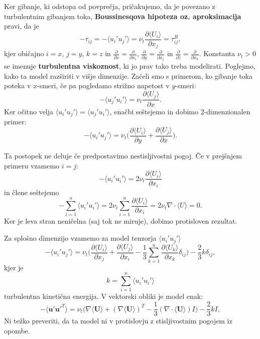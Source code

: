 \documentclass[mat2, tisk]{fmfdelo}
\newcommand{\bd}{\textbf}
\begin{document}
Ker gibanje, ki odstopa od povprečja, pričakujemo, da je povezano z turbulentnim
gibanjem toka, \bd{Boussinesqova hipoteza oz. aproksimacija} pravi, da je 
\begin{equation}
-\tau_{ij} = -\langle u_i' u_j'\rangle = \nu_t \frac{\partial \langle U_i\rangle}{\partial x_j} = \tau_{ij}^R,
\end{equation}
kjer običajno $i=x$, $j=y$, $k=z$ in $\frac{\partial}{\partial x} = \frac{\partial}{\partial x_i}$, $\frac{\partial}{\partial y} = \frac{\partial}{\partial x_j}$ in 
$\frac{\partial}{\partial z} = \frac{\partial}{\partial x_k}$. Konstanta $\nu_t>0$ se imenuje \bd{turbulentna viskoznost}, 
ki jo prav tako treba modelirati. Poglejmo, kako ta model razširiti v višje dimenzije. 
Začeli smo s primerom, ko gibanje toka poteka v $x$-smeri, če pa 
pogledamo strižno napetost v $y$-smeri:
$$
-\langle u_j' u_i' \rangle = \nu_t \frac{\partial \langle U_j\rangle}{\partial x}.
$$
Ker očitno velja $\langle u_i' u_j' \rangle = \langle u_j' u_i' \rangle$, enačbi seštejemo in 
dobimo $2$-dimenzionalen primer: 
\begin{equation}
\label{eq:2dmodel}
-\langle u_i' u_j' \rangle = \nu_t \Big(\frac{\partial \langle U_i\rangle}{\partial y} + \frac{\partial \langle U_j\rangle}{\partial x}\Big).
\end{equation}
\begin{opomba}
Ta postopek ne deluje če predpostavimo nestisljivostni pogoj. 
Če v prejšnjem primeru vzamemo $i=j$:
$$
-\langle u_i' u_i' \rangle = 2\nu_t \frac{\partial \langle U_i\rangle}{\partial x_i}
$$
in člene seštejemo 
$$
-\sum_{i=1}^n \langle u_i' u_i' \rangle = 2\nu_t \sum_{i=1}^n \frac{\partial \langle U_i\rangle}{\partial x_i} = 2\nu_t \nabla\cdot \langle U\rangle = 0.
$$
Ker je leva stran neničelna (saj tok ne miruje), dobimo protisloven rezultat.
\end{opomba}
Za splošno dimenzijo vzamemo za model tenzorja $\langle u_i' u_j' \rangle$
\begin{equation}
- \langle u_i' u_j' \rangle = \nu_t \Big(\frac{\partial\langle U_i\rangle}{\partial x_j} + \frac{\partial\langle U_j\rangle}{\partial x_i}
- \frac{1}{3} \sum_{k=1}^n \frac{\partial\langle U_k\rangle}{\partial x_k}\delta_{ij}\Big) - \frac{2}{3}k\delta_{ij},
\end{equation}
kjer je 
$$k = \sum_{i=1}^n \langle u_i' u_i' \rangle$$ 
turbulentna kinetična energija. V vektorski obliki je model enak:
\begin{equation}
-\langle \bd{u}' \bd{u}'^T \rangle = \nu_t \Big(\nabla\langle \bd{U}\rangle + (\nabla\langle \bd{U}\rangle)^T - \frac{1}{3}(\nabla\cdot\langle \bd{U}\rangle)I\Big) - \frac{2}{3}kI,
\end{equation}
Ni težko preveriti, da ta model ni v protislovju z stisljivostnim pogojem iz opombe.
\end{document}
